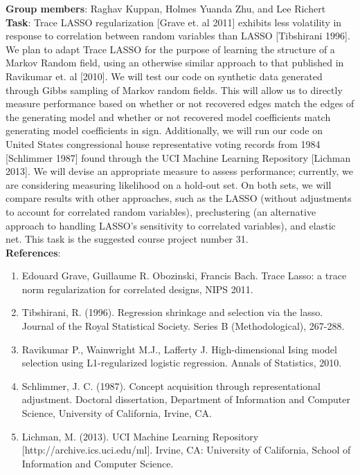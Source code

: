 \documentclass{article}
\begin{document}
\textbf{Group members}: Raghav Kuppan, Holmes Yuanda Zhu, and Lee Richert\\

\textbf{Task}: Trace LASSO regularization [Grave et. al 2011] exhibits less volatility in response to correlation between random variables than LASSO [Tibshirani 1996].  We plan to adapt Trace LASSO for the purpose of learning the structure of a Markov Random field, using an otherwise similar approach to that published in Ravikumar et. al [2010]. We will test our code on synthetic data generated through Gibbs sampling of Markov random fields. This will allow us to directly measure performance based on whether or not recovered edges match the edges of the generating model and whether or not recovered model coefficients match generating model coefficients in sign.  Additionally, we will run our code on United States congressional house representative voting records from 1984 [Schlimmer 1987] found through the UCI Machine Learning Repository [Lichman 2013]. We will devise an appropriate measure to assess performance; currently, we are considering measuring likelihood on a hold-out set. On both sets, we will compare results with other approaches, such as the LASSO (without adjustments to account for correlated random variables), preclustering (an alternative approach to handling LASSO's sensitivity to correlated variables), and elastic net. This task is the suggested course project number 31.\\


\textbf{References}:
\begin{enumerate}
\item
Edouard Grave, Guillaume R. Obozinski, Francis Bach. Trace Lasso: a trace norm 
regularization for correlated designs, NIPS 2011.

\item
Tibshirani, R. (1996). Regression shrinkage and selection via the lasso. Journal of the Royal Statistical Society. Series B (Methodological), 267-288.

\item
Ravikumar P., Wainwright M.J., Lafferty J. High-dimensional Ising model selection using L1-regularized logistic regression. Annals of Statistics, 2010.

\item
Schlimmer, J. C. (1987). Concept acquisition through representational adjustment. Doctoral dissertation, Department of Information and Computer Science, University of California, Irvine, CA.

\item
Lichman, M. (2013). UCI Machine Learning Repository [http://archive.ics.uci.edu/ml]. Irvine, CA: University of California, School of Information and Computer Science. 
\end{enumerate}
\end{document}

